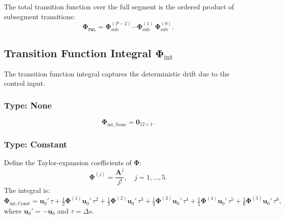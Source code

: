 \documentclass[11pt,a4paper]{article}
\newcommand{\bPhi}{\bm{\Phi}}
\newcommand{\bA}{\mathbf{A}}
\newcommand{\bzero}{\mathbf{0}}
\begin{document}
The total transition function over the full segment is the ordered product of subsegment transitions:
\begin{equation}
    \bPhi_{\texttt{PwL}} = \bPhi_{\mathrm{sub}}^{(P-2)} \cdots \bPhi_{\mathrm{sub}}^{(1)}\,\bPhi_{\mathrm{sub}}^{(0)}.
\end{equation}

\subsection{Transition Function Integral \texorpdfstring{$\bPhi_{\mathrm{int}}$}{Phi\_int}}
\label{sec:general-phi-int}

The transition function integral captures the deterministic drift due to the control input.

\subsubsection{Type: None}
\begin{equation}
    \bPhi_{\mathrm{int, None}} = \bzero_{12 \times 1}.
\end{equation}

\subsubsection{Type: Constant}
Define the Taylor-expansion coefficients of $\bPhi$:
\begin{equation}
    \bPhi^{(j)} = \frac{\bA^j}{j!}, \quad j=1,\ldots,5.
    \label{eq:phi-taylor-coeff}
\end{equation}
The integral is:
\begin{equation}
    \bPhi_{\mathrm{int, Const}} = \mathbf{u}_0'\,\tau + \tfrac{1}{2}\bPhi^{(1)}\mathbf{u}_0'\,\tau^2 + \tfrac{1}{3}\bPhi^{(2)}\mathbf{u}_0'\,\tau^3 + \tfrac{1}{4}\bPhi^{(3)}\mathbf{u}_0'\,\tau^4 + \tfrac{1}{5}\bPhi^{(4)}\mathbf{u}_0'\,\tau^5 + \tfrac{1}{6}\bPhi^{(5)}\mathbf{u}_0'\,\tau^6,
    \label{eq:phi-int-constant}
\end{equation}
where $\mathbf{u}_0' = -\mathbf{u}_0$ and $\tau = \Delta s$.
\end{document}
